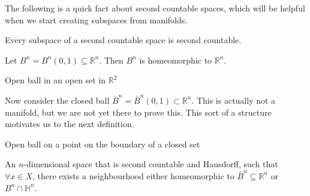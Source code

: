 \documentclass[notoc,notitlepage]{tufte-book}
\begin{document}
The following is a quick fact about second countable spaces, which will be helpful
when we start creating subspaces from manifolds.

\begin{propo}\label{propo:subspaces_of_second_countable_spaces_are_second_countable}
  Every subspace of a second countable space is second countable.
\end{propo}

\begin{eg}
  Let $B^n = B^n(0, 1) \subseteq \mathbb{R}^n$. Then $B^n$ is homeomorphic to
  $\mathbb{R}^n$.
  \begin{marginfigure}
    \centering
    \caption{Open ball in an open set in $\mathbb{R}^2$}\label{fig:open_ball_in_an_open_set_in_r_2_}
  \end{marginfigure}
\end{eg}

\begin{eg}
  Now consider the closed ball $\bar{B}^n = \bar{B}^n(0, 1) \subset \mathbb{R}^n$. This is
  actually not a manifold, but we are not yet there to prove this. This sort of a structure
  motivates us to the next definition.
  \begin{marginfigure}
    \centering
    \caption{Open ball on a point on the boundary of a closed set}\label{fig:open_ball_on_a_point_on_the_boundary_of_a_closed_set}
  \end{marginfigure}
\end{eg}

\begin{defn}\label{defn:manifold_with_boundary}
  An $n$-dimensional space that is second countable and Hausdorff, such that $\forall x \in X$,
  there exists a neighbourhood either homeomorphic to $\bar{B}^n \subseteq \mathbb{R}^n$ or
  $B^n \cap \mathbb{H}^n$.
\end{defn}
\end{document}
